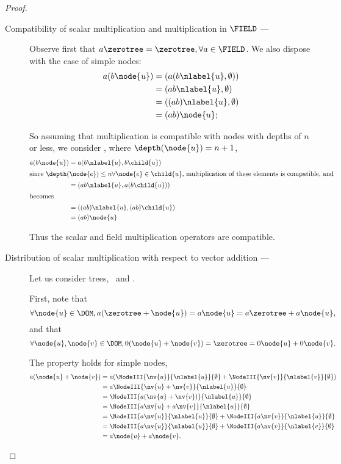 \begin{proposition}
\begin{proof}
\begin{description}
    \item[Compatibility of scalar multiplication and multiplication in
      $\FIELD$ --- ]

      Observe first that $a \zerotree = \zerotree, \forall a \in
      \FIELD$. We also dispose with the case of simple nodes:
      \begin{align*}
        a(b \node{u}) &= (a(b \nlabel{u}, \emptyset)) \\
        &= (a b \nlabel{u}, \emptyset) \\
        &= ((a b) \nlabel{u}, \emptyset) \\
        &= (a b) \node{u};
      \end{align*}

      So assuming that multiplication is compatible with nodes with
      depths of $n$ or less, we consider , where $\depth(\node{u})
      = n+1$,
      \begin{align*}
        a (b \node{u}) &= a (b  \nlabel{u}, b\child{u}) \\
        \intertext{since $\depth(\node{e}) \leq n \forall \node{e}\in \child{u},$ multiplication of these elements is compatible, and }
        &= (a b\/ \nlabel{u}, a(b\child{u})) \\
        \intertext{becomes}
        &= ((a b) \nlabel{u}, (a b)\child{u}) \\
        &= (a b) \node{u}
      \end{align*}

      Thus the scalar and field multiplication operators are compatible.

    \item[Distribution of scalar multiplication with respect to vector addition --- ]

      Let us consider trees, \ and .

      First, note that \[\forall \node{u} \in \DOM, a(\zerotree + \node{u}) = a \node{u} = a\zerotree + a \node{u},\]
      and that \[\forall \node{u},\node{v}\in\DOM, 0 (\node{u} + \node{v}) = \zerotree = 0 \node{u} + 0 \node{v}.\]

      The property holds for simple nodes, 
      \begin{align*}
        a(\node{u} + \node{v}) &= a (\NodeIII{\nv{u}}{\nlabel{u}}{\emptyset} + \NodeIII{\nv{v}}{\nlabel{v}}{\emptyset})\\ 
        &= a \NodeIII{\nv{u} +  {\nv{v}}}{\nlabel{u}}{\emptyset} \\
        &= \NodeIII{a(\nv{u}+\nv{v})}{\nlabel{u}}{\emptyset} \\
        &= \NodeIII{a\nv{u} + a\nv{v}}{\nlabel{u}}{\emptyset} \\
        &= \NodeIII{a\nv{u}}{\nlabel{u}}{\emptyset} + \NodeIII{a\nv{v}}{\nlabel{u}}{\emptyset} \\
        &= \NodeIII{a\nv{u}}{\nlabel{u}}{\emptyset} + \NodeIII{a\nv{v}}{\nlabel{v}}{\emptyset} \\
        &= a \node{u} + a \node{v}.
      \end{align*}


\end{description}
\end{proof}
\end{proposition}
